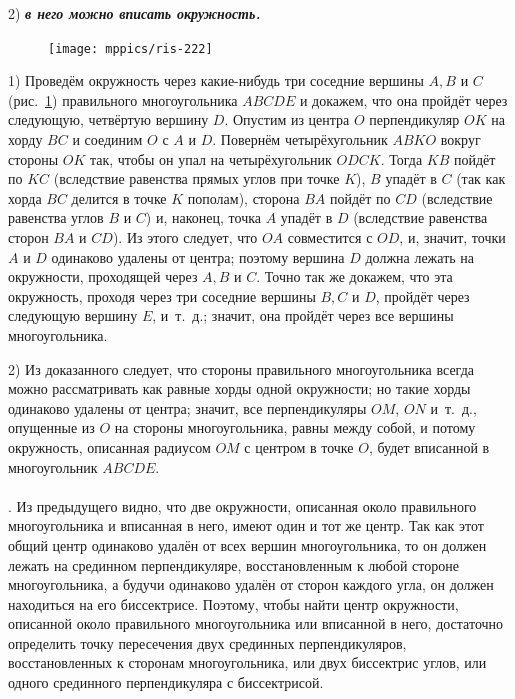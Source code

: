 \documentclass[oneside]{book}
\begin{document}
2) \textbf{\emph{в него можно вписать окружность.}}

\begin{figure}
\centering
\texttt{[image: mppics/ris-222]}
\caption{}\label{1938/ris-222}
\end{figure}

1) Проведём окружность через какие-нибудь три соседние вершины $A, B$ и $C$ (рис.~\ref{1938/ris-222}) правильного многоугольника $ABCDE$ и докажем, что она пройдёт через следующую, четвёртую вершину $D$.
Опустим из центра $O$ перпендикуляр $OK$ на хорду $BC$ и соединим $O$ с $A$ и $D$.
Повернём четырёхугольник $ABKO$ вокруг стороны $OK$ так, чтобы он упал на четырёхугольник $ODCK$.
Тогда $KB$ пойдёт по $KC$ (вследствие равенства прямых углов при точке $K$), 
$B$ упадёт в $C$ (так как хорда $BC$ делится в точке $K$ пополам), 
сторона $BA$ пойдёт по $CD$ (вследствие равенства углов $B$ и $C$)
и, наконец, точка $A$ упадёт в $D$ (вследствие равенства сторон $BA$ и $CD$).
Из этого следует, что $OA$ совместится с $OD$, и, значит, точки $A$ и $D$ одинаково удалены от центра;
поэтому вершина $D$ должна лежать на окружности, проходящей через $A, B$ и $C$.
Точно так же докажем, что эта окружность, проходя через три соседние вершины $B, C$ и $D$, пройдёт через следующую вершину $E$, и~т.~д.;
значит, она пройдёт через все вершины многоугольника.

2) Из доказанного следует, что стороны правильного многоугольника всегда можно рассматривать как равные хорды одной окружности;
но такие хорды одинаково удалены от центра;
значит, все перпендикуляры $OM$, $ON$ и~т.~д., опущенные из $O$ на стороны многоугольника, равны между собой, и потому окружность, описанная радиусом $OM$ с центром в точке $O$, будет вписанной в многоугольник $ABCDE$.

\paragraph{}\label{1938/216}
.
Из предыдущего видно, что две окружности, описанная около правильного многоугольника и вписанная в него, имеют один и тот же центр.
Так как этот общий центр одинаково удалён от всех вершин многоугольника, то он должен лежать на срединном перпендикуляре, восстановленным к любой стороне многоугольника, а будучи одинаково удалён от сторон каждого угла, он должен находиться на его биссектрисе.
Поэтому, чтобы найти центр окружности, описанной около правильного многоугольника или вписанной в него, достаточно определить точку пересечения двух срединных перпендикуляров, восстановленных к сторонам многоугольника, или двух биссектрис углов, или одного срединного перпендикуляра с биссектрисой.
\end{document}
